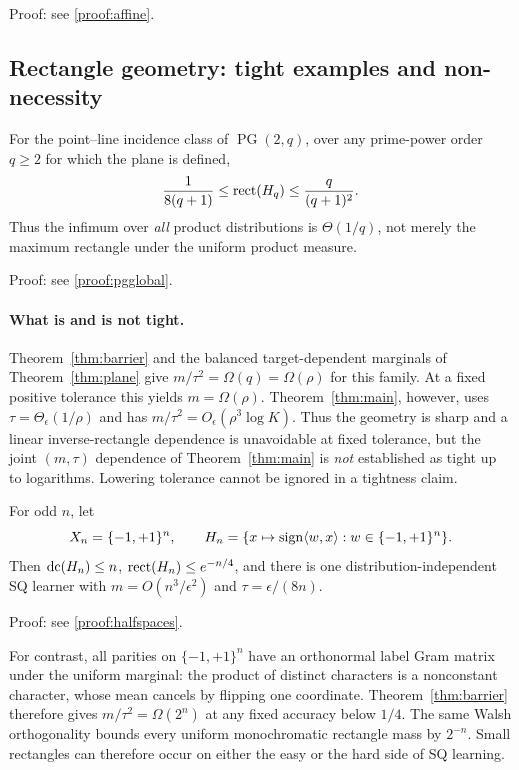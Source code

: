 \noindent Proof: see \cref{proof:affine}.\par


\subsection{Rectangle geometry: tight examples and non-necessity}\label{sec:landscape}

\begin{theorem}\label{thm:pgglobal}
For the point--line incidence class of $\operatorname{PG}(2,q)$, over any prime-power order $q\ge2$ for which the plane is defined,
\[
 \frac1{8(q+1)}\le\operatorname{rect}(H_q)\le\frac{q}{(q+1)^2}.
\]
Thus the infimum over \emph{all} product distributions is $\Theta(1/q)$, not merely the maximum rectangle under the uniform product measure.
\end{theorem}

\noindent Proof: see \cref{proof:pgglobal}.\par


\paragraph{What is and is not tight.}
Theorem~\ref{thm:barrier} and the balanced target-dependent marginals of Theorem~\ref{thm:plane} give $m/\tau^2=\Omega(q)=\Omega(\rho)$ for this family. At a fixed positive tolerance this yields $m=\Omega(\rho)$. Theorem~\ref{thm:main}, however, uses $\tau=\Theta_\epsilon(1/\rho)$ and has $m/\tau^2=O_\epsilon(\rho^3\log K)$. Thus the geometry is sharp and a linear inverse-rectangle dependence is unavoidable at fixed tolerance, but the joint $(m,\tau)$ dependence of Theorem~\ref{thm:main} is \emph{not} established as tight up to logarithms. Lowering tolerance cannot be ignored in a tightness claim.


\begin{theorem}\label{thm:halfspaces}
For odd $n$, let
\[
 X_n=\{-1,+1\}^n,\qquad
 H_n=\{x\mapsto\operatorname{sign}\langle w,x\rangle:w\in\{-1,+1\}^n\}.
\]
Then $\operatorname{dc}(H_n)\le n$, $\operatorname{rect}(H_n)\le e^{-n/4}$, and there is one distribution-independent SQ learner with $m=O(n^3/\epsilon^2)$ and $\tau=\epsilon/(8n)$.
\end{theorem}

\noindent Proof: see \cref{proof:halfspaces}.\par


For contrast, all parities on $\{-1,+1\}^n$ have an orthonormal label Gram matrix under the uniform marginal: the product of distinct characters is a nonconstant character, whose mean cancels by flipping one coordinate. Theorem~\ref{thm:barrier} therefore gives $m/\tau^2=\Omega(2^n)$ at any fixed accuracy below $1/4$. The same Walsh orthogonality bounds every uniform monochromatic rectangle mass by $2^{-n}$. Small rectangles can therefore occur on either the easy or the hard side of SQ learning.

